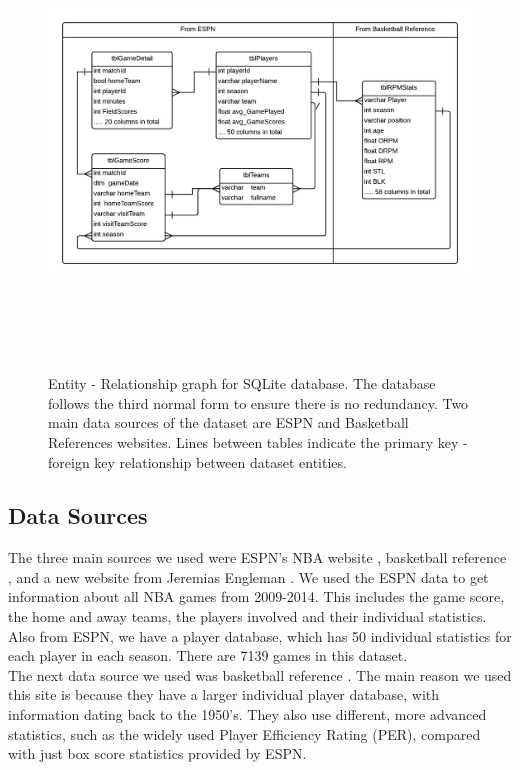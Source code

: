 \documentclass{article} %
\begin{document}
\begin{figure}
		\centering
		\includegraphics[width=150mm, height=120mm]{sqliteERDiagram.png}	
		\caption{Entity - Relationship graph for SQLite database. The database follows the third normal form to ensure there is no redundancy. Two main data sources of the dataset are ESPN and Basketball References websites. Lines between tables indicate the primary key - foreign key relationship between dataset entities.}
		\label{fig:database}
\end{figure}

\subsection{Data Sources}
	The three main sources we used were ESPN's NBA website \cite{espn}, basketball reference \cite{bball_ref}, and a new website from Jeremias Engleman \cite{rpm_data}. We used the ESPN data to get information about all NBA games from 2009-2014. This includes the game score, the home and away teams, the players involved and their individual statistics. Also from ESPN, we have a player database, which has 50 individual statistics for each player in each season. There are 7139 games in this dataset. \\

	The next data source we used was basketball reference \cite{bball_ref}. The main reason we used this site is because they have a larger individual player database, with information dating back to the 1950's. They also use different, more advanced statistics, such as the widely used Player Efficiency Rating (PER), compared with just box score statistics provided by ESPN. \\
\end{document}
